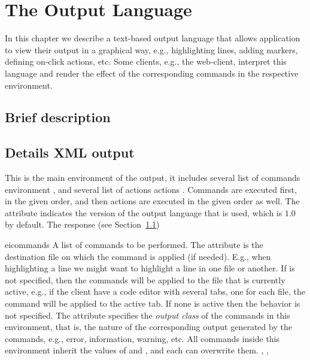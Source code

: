 {%
}

\chapter{The \ei Output Language}
\label{ch:eiol}

In this chapter we describe a text-based output language that allows
application to view their output in a graphical way, e.g.,
highlighting lines, adding markers, defining on-click actions, etc.
%
Some clients, e.g., the web-client, interpret this language and render
the effect of the corresponding commands in the respective environment.


\section{Brief description}
\label{outputmanager:sec:desc}

\section{Details XML output}
\label{outputmanager:sec:output}


\bigskip

{
%
  This is the main environment of the output, it includes several list
  of commands environment , and several list
  of actions actions . 
%
  Commands are executed first, in the given order, and then actions are
  executed in the given order as well.
%
  The  attribute indicates the version of the
  output language that is used, which is $1.0$ by default.
%
}
{The \app response (see Section~\ref{outputmanager:sec:desc})}


\bigskip
\xmlstruct
{eicommands}
{
%
A list of commands to be performed.
%
The attribute  is the destination file on which
the command is applied (if needed).
%
E.g., when highlighting a line we might want to highlight a line in
one file or another. 
%
If  is not specified, then the commands will be
applied to the file that is currently active, e.g., if the client have
a code editor with several tabs, one for each file, the command will
be applied to the active tab. If none is active then the behavior is
not specified.
% 
The attribute  specifies the \emph{output
  class} of the commands in this environment, that is, the nature of
the corresponding output generated by the commands, e.g., error,
information, warning, etc.
%
All commands inside this environment inherit the values of
 and , and each can
overwrite them.
%
}
{, , }

